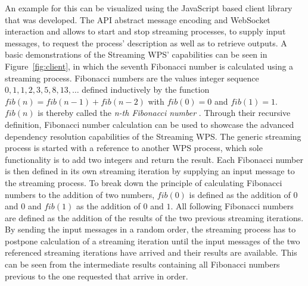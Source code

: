 		An example for this can be visualized using the JavaScript based client library that was developed. The \ac{API} abstract message encoding and WebSocket interaction and allows to start and stop streaming processes, to supply input messages, to request the process' description as well as to retrieve outputs. A basic demonstrations of the Streaming WPS' capabilities can be seen in Figure~\ref{fig:client}, in which the seventh Fibonacci number is calculated using a streaming process. Fibonacci numbers are the values integer sequence $0, 1, 1, 2, 3, 5, 8, 13, \dots$ defined inductively by the function $fib(n) = fib(n-1) + fib(n-2)$ with $fib(0) = 0$ and $fib(1) = 1$. $fib(n)$ is thereby called the \emph{n-th Fibonacci number} \citep{fibonacci}. Through their recursive definition, Fibonacci number calculation can be used to showcase the advanced dependency resolution capabilities of the Streaming WPS. The generic streaming process is started with a reference to another WPS process, which sole functionality is to add two integers and return the result. Each Fibonacci number is then defined in its own streaming iteration by supplying an input message to the streaming process. To break down the principle of calculating Fibonacci numbers to the addition of two numbers, $fib(0)$ is defined as the addition of $0$ and $0$ and $fib(1)$ as the addition of $0$ and $1$. All following Fibonacci numbers are defined as the addition of the results of the two previous streaming iterations. By sending the input messages in a random order, the streaming process has to postpone calculation of a streaming iteration until the input messages of the two referenced streaming iterations have arrived and their results are available. This can be seen from the intermediate results containing all Fibonacci numbers previous to the one requested that arrive in order.
